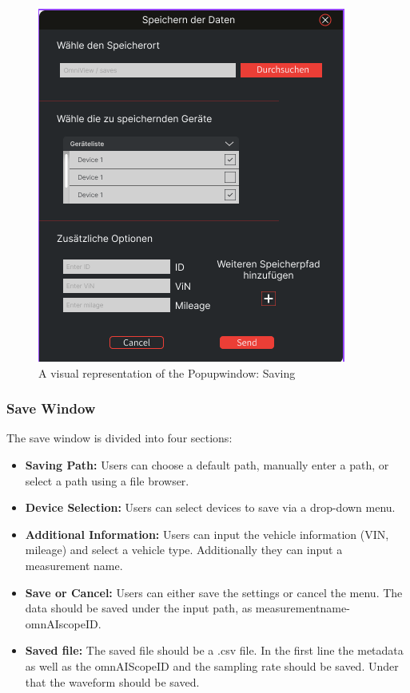 \documentclass[]{scrreprt}
\begin{document}
\begin{figure}
    \includegraphics[width=.9\textwidth]{assets/pictures/Popupwindow_png.png}
    \caption[]{A visual representation of the Popupwindow: Saving}
    \label{fig:SavingWindow}
    \end{figure}

\subsubsection{Save Window}
The save window is divided into four sections:
\begin{itemize}
\item \textbf{Saving Path:} Users can choose a default path, manually enter a path, or select a path using a file browser.
\item \textbf{Device Selection:} Users can select devices to save via a drop-down menu.
\item \textbf{Additional Information:} Users can input the vehicle information (VIN, mileage) and select a vehicle type. Additionally they can input a measurement name.
\item \textbf{Save or Cancel:} Users can either save the settings or cancel the menu. The data should be saved under the input path, as measurementname-omnAIscopeID. 
\item \textbf{Saved file:} The saved file should be a .csv file. In the first line the metadata as well as the omnAIScopeID and the sampling rate should be saved. 
                            Under that the waveform should be saved. 
\end{itemize}
\end{document}

